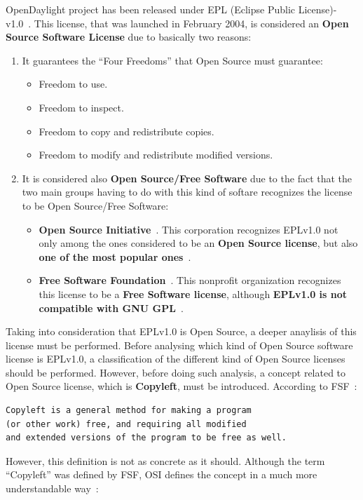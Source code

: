 \documentclass[a4paper, 12pt]{book}
\begin{document}
OpenDaylight project has been released under EPL (Eclipse Public License)-v1.0~\cite{EPLv1}. This license, that was launched in February 2004, is considered an \textbf{Open Source Software License} due to basically two reasons:
\begin{enumerate}\itemsep0pt
 \item {It guarantees the ``Four Freedoms'' that Open Source must guarantee}:
  \begin{itemize}\itemsep0pt
   \item{Freedom to use}.
   \item{Freedom to inspect}.
   \item{Freedom to copy and redistribute copies}.
   \item{Freedom to modify and redistribute modified versions}.
  \end{itemize}
 \item {It is considered also \textbf{Open Source/Free Software} due to the fact that the two main groups having to do with this kind of softare recognizes the license to be Open Source/Free Software}:
  \begin{itemize}\itemsep0pt
   \item{\textbf{Open Source Initiative}~\cite{OpenSourceInitiiative}}. This corporation recognizes EPLv1.0 not only among the ones considered to be an \textbf{Open Source license}, but also \textbf{one of the most popular ones}~\cite{OSILicenses}.
   \item{\textbf{Free Software Foundation}~\cite{FreeSoftwareFoundation}}. This nonprofit organization recognizes this license to be a \textbf{Free Software license}, although \textbf{EPLv1.0 is not compatible with GNU GPL}~\cite{FSFLicense}.
  \end{itemize}
\end{enumerate}
Taking into consideration that EPLv1.0 is Open Source, a deeper anaylisis of this license must be performed. Before analysing which kind of Open Source software license is EPLv1.0, a classification of the different kind of Open Source licenses should be performed. However, before doing such analysis, a concept related to Open Source license, which is \textbf{Copyleft}, must be introduced. According to FSF~\cite{FSFCopyleft}:
\begin{verbatim}
Copyleft is a general method for making a program
(or other work) free, and requiring all modified
and extended versions of the program to be free as well.
\end{verbatim}
However, this definition is not as concrete as it should. Although the term ``Copyleft'' was defined by FSF, OSI defines the concept in a much more understandable way~\cite{OSICopyleft}:
\end{document}
